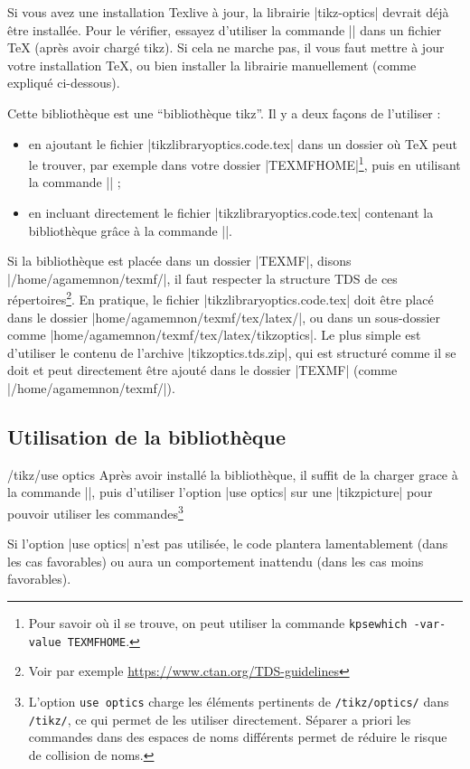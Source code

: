 \documentclass[a4paper]{ltxdoc}
\begin{document}
Si vous avez une installation Texlive à jour, la librairie |tikz-optics| devrait déjà être installée. 
Pour le vérifier, essayez d'utiliser la commande |\usetikzlibrary{optics}| dans un fichier \TeX{} (après avoir chargé tikz). Si cela ne marche pas, il vous faut mettre à jour votre installation \TeX{}, ou bien installer la librairie manuellement (comme expliqué ci-dessous).

Cette bibliothèque est une \enquote{bibliothèque tikz}. Il y a deux façons de l'utiliser : 
\begin{itemize}
  \item en ajoutant le fichier |tikzlibraryoptics.code.tex| dans un dossier où \TeX{} peut le trouver, par exemple dans votre dossier |TEXMFHOME|\footnote{Pour savoir où il se trouve, on peut utiliser la commande \verb|kpsewhich -var-value TEXMFHOME|. }, puis en utilisant la commande |\usetikzlibrary{optics}| ;
  \item en incluant directement le fichier |tikzlibraryoptics.code.tex| contenant la bibliothèque grâce à la commande ||.
\end{itemize}

Si la bibliothèque est placée dans un dossier |TEXMF|, disons |/home/agamemnon/texmf/|, il faut respecter la structure TDS de ces répertoires\footnote{Voir par exemple \url{https://www.ctan.org/TDS-guidelines}}. En pratique, le fichier |tikzlibraryoptics.code.tex| doit être placé dans le dossier |home/agamemnon/texmf/tex/latex/|, ou dans un sous-dossier comme |home/agamemnon/texmf/tex/latex/tikzoptics|. Le plus simple est d'utiliser le contenu de l'archive |tikzoptics.tds.zip|, qui est structuré comme il se doit et peut directement être ajouté dans le dossier |TEXMF| (comme |/home/agamemnon/texmf/|).

\subsection{Utilisation de la bibliothèque}

\begin{key}{/tikz/use optics}
Après avoir installé la bibliothèque, il suffit de la charger grace à la commande |\usetikzlibrary{optics}|, puis d'utiliser l'option |use optics| sur une |tikzpicture| pour pouvoir utiliser les commandes\footnote{L'option \texttt{use optics} charge les éléments pertinents de \texttt{/tikz/optics/} dans \texttt{/tikz/}, ce qui permet de les utiliser directement. Séparer a priori les commandes dans des espaces de noms différents permet de réduire le risque de collision de noms.}

\begin{codeexample}[width=5cm]
\end{codeexample}

Si l'option |use optics| n'est pas utilisée, le code plantera lamentablement (dans les cas favorables) ou aura un comportement inattendu (dans les cas moins favorables).
\end{key}
\end{document}
